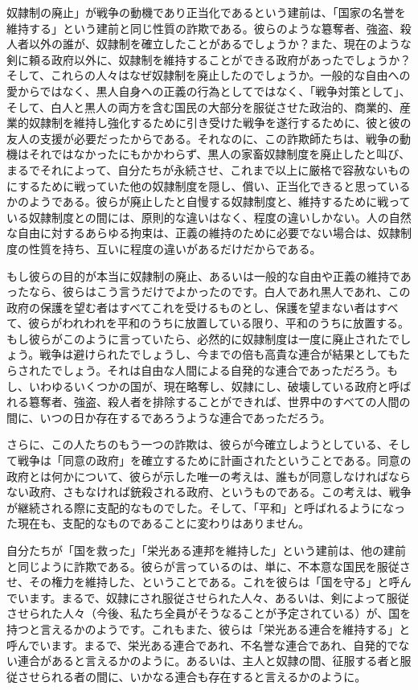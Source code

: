 \documentclass[dvipdfmx, uplatex, tate, landscape]{utbook}
\begin{document}
奴隷制の廃止」が戦争の動機であり正当化であるという建前は、「国家の名誉を維持する」という建前と同じ性質の詐欺である。彼らのような簒奪者、強盗、殺人者以外の誰が、奴隷制を確立したことがあるでしょうか？また、現在のような剣に頼る政府以外に、奴隷制を維持することができる政府があったでしょうか？そして、これらの人々はなぜ奴隷制を廃止したのでしょうか。一般的な自由への愛からではなく、黒人自身への正義の行為としてではなく、「戦争対策として」、そして、白人と黒人の両方を含む国民の大部分を服従させた政治的、商業的、産業的奴隷制を維持し強化するために引き受けた戦争を遂行するために、彼と彼の友人の支援が必要だったからである。それなのに、この詐欺師たちは、戦争の動機はそれではなかったにもかかわらず、黒人の家畜奴隷制度を廃止したと叫び、まるでそれによって、自分たちが永続させ、これまで以上に厳格で容赦ないものにするために戦っていた他の奴隷制度を隠し、償い、正当化できると思っているかのようである。彼らが廃止したと自慢する奴隷制度と、維持するために戦っている奴隷制度との間には、原則的な違いはなく、程度の違いしかない。人の自然な自由に対するあらゆる拘束は、正義の維持のために必要でない場合は、奴隷制度の性質を持ち、互いに程度の違いがあるだけだからである。

もし彼らの目的が本当に奴隷制の廃止、あるいは一般的な自由や正義の維持であったなら、彼らはこう言うだけでよかったのです。白人であれ黒人であれ、この政府の保護を望む者はすべてこれを受けるものとし、保護を望まない者はすべて、彼らがわれわれを平和のうちに放置している限り、平和のうちに放置する。もし彼らがこのように言っていたら、必然的に奴隷制度は一度に廃止されたでしょう。戦争は避けられたでしょうし、今までの倍も高貴な連合が結果としてもたらされたでしょう。それは自由な人間による自発的な連合であっただろう。もし、いわゆるいくつかの国が、現在略奪し、奴隷にし、破壊している政府と呼ばれる簒奪者、強盗、殺人者を排除することができれば、世界中のすべての人間の間に、いつの日か存在するであろうような連合であっただろう。

さらに、この人たちのもう一つの詐欺は、彼らが今確立しようとしている、そして戦争は「同意の政府」を確立するために計画されたということである。同意の政府とは何かについて、彼らが示した唯一の考えは、誰もが同意しなければならない政府、さもなければ銃殺される政府、というものである。この考えは、戦争が継続される際に支配的なものでした。そして、「平和」と呼ばれるようになった現在も、支配的なものであることに変わりはありません。

自分たちが「国を救った」「栄光ある連邦を維持した」という建前は、他の建前と同じように詐欺である。彼らが言っているのは、単に、不本意な国民を服従させ、その権力を維持した、ということである。これを彼らは「国を守る」と呼んでいます。まるで、奴隷にされ服従させられた人々、あるいは、剣によって服従させられた人々（今後、私たち全員がそうなることが予定されている）が、国を持つと言えるかのようです。これもまた、彼らは「栄光ある連合を維持する」と呼んでいます。まるで、栄光ある連合であれ、不名誉な連合であれ、自発的でない連合があると言えるかのように。あるいは、主人と奴隷の間、征服する者と服従させられる者の間に、いかなる連合も存在すると言えるかのように。
\end{document}
